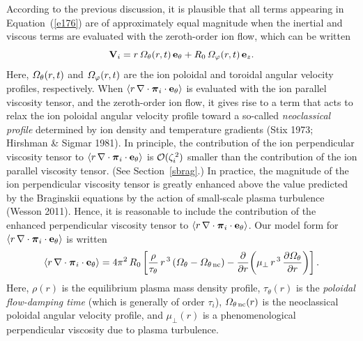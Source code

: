 \documentclass[notitlepage,12pt]{article}
\newcommand{\bpi}{\mbox{\boldmath$\pi$}}
\begin{document}
According to the previous discussion, it is plausible that all terms appearing in Equation~(\ref{e176}) are of approximately equal
magnitude when the inertial and viscous terms are evaluated with the zeroth-order ion flow, which can be written
\begin{equation}
{\bf V}_i = r\,{\mit\Omega}_\theta(r,t)\,{\bf e}_\theta + R_0\,{\mit\Omega}_\varphi(r,t)\,{\bf e}_z.
\end{equation}
Here, ${\mit\Omega}_\theta(r,t)$ and ${\mit\Omega}_\varphi(r,t)$ are the ion poloidal and toroidal angular velocity
profiles, respectively. When $\langle r\,\nabla\cdot \bpi_i\cdot{\bf e}_\theta\rangle$ is evaluated with  the ion parallel viscosity tensor, and the zeroth-order
ion flow, it gives rise to a term that acts to relax the ion poloidal angular velocity profile toward a so-called {\em neoclassical
profile}\/ determined by ion density and temperature gradients (Stix 1973; Hirshman \& Sigmar 1981). In principle, the
contribution of the ion perpendicular viscosity tensor to $\langle r\,\nabla\cdot \bpi_i\cdot{\bf e}_\theta\rangle$ 
is ${\cal O}(\zeta_i^{\,2})$ smaller than the contribution of the ion parallel viscosity tensor. (See Section~\ref{sbrag}.) In practice, the magnitude of the ion perpendicular
viscosity tensor is greatly enhanced above the value predicted by the Braginskii equations by the action of small-scale
plasma turbulence (Wesson 2011). Hence, it is reasonable to include the contribution of the enhanced perpendicular
viscosity tensor to $\langle r\,\nabla\cdot \bpi_i\cdot{\bf e}_\theta\rangle$. Our model form for $\langle r\,\nabla\cdot \bpi_i\cdot{\bf e}_\theta\rangle$ is written
\begin{equation}\label{e178}
\langle r\,\nabla\cdot \bpi_i\cdot{\bf e}_\theta\rangle = 4\pi^2\,R_0\left[ \frac{\rho}{\tau_\theta}\,r^{\,3}\,({\mit\Omega}_\theta-{\mit\Omega}_{\theta\,{\rm nc}}) -\frac{\partial}{\partial r}\!\left(\mu_\perp\,r^{\,3}\,\frac{\partial{\mit\Omega}_\theta}{\partial r}\right)\right].
\end{equation}
Here, $\rho(r)$ is the equilibrium plasma mass density profile, $\tau_\theta(r)$ is the {\em poloidal flow-damping time}\/ (which
is generally of order $\tau_i$), ${\mit\Omega}_{\theta\,{\rm nc}}(r)$ is the neoclassical poloidal angular velocity profile, and
$\mu_\perp(r)$ is a phenomenological perpendicular viscosity due to plasma turbulence. 
\end{document}
